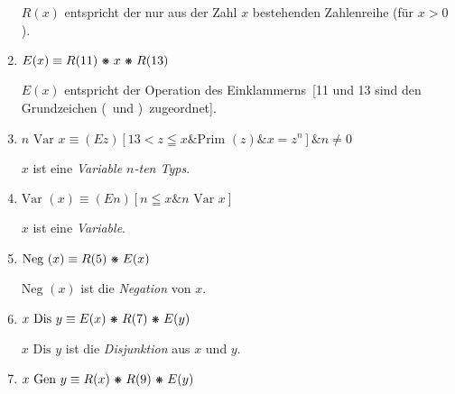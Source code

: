 \documentclass[draft]{scrartcl}
\begin{document}
\begin{enumerate}[1.]
	$R\left(x\right)$ entspricht der nur aus der Zahl $x$ bestehenden Zahlenreihe (für $x > 0$).

	\item {} $E\left(x\right) \equiv R\left(11\right) \pmstar x \pmstar R\left(13\right)$

	$E\left(x\right)$ entspricht der Operation des \glqq Einklammerns\grqq\ [11 und 13 sind den Grundzeichen
	\glqq(\grqq\ und \glqq)\grqq\ zugeordnet].

	\item {}$n\text{ Var } x \equiv \left(Ez\right)\left[13 < z \leqq x \& \text{Prim }\left(z\right) \& x = z^n\right] \& n \neq 0$%

	$x$ ist eine \textit{Variable $n$-ten Typs}.

	\item $\text{Var }\left(x\right) \equiv \left(En\right)\left[n \leqq x \& n \text{ Var } x\right]$%

	$x$ ist eine \textit{Variable}.

	\item {} $\text{Neg }\left(x\right) \equiv R\left(5\right) \pmstar E\left(x\right)$

	$\text{Neg }\left(x\right)$ ist die \textit{Negation} von
	$x$.

	\item {}$x \text{ Dis } y \equiv E\left(x\right) \pmstar R\left(7\right) \pmstar E\left(y\right)$%

	$x \text{ Dis } y$ ist die \textit{Disjunktion} aus $x$ und $y$.

	\item {} $x \text{ Gen } y \equiv R\left(x\right) \pmstar R\left(9\right) \pmstar E\left(y\right)$%


\end{enumerate}
\end{document}
